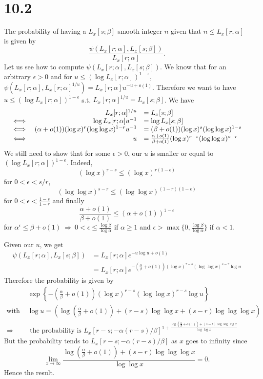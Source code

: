 \documentclass[12pt,a4paper]{article}
\newcommand {\thus}{\Rightarrow\:}
\newcommand {\Lfunc}[2]{L_x[#1;#2]}
\newcommand {\Ls}{\Lfunc{s}{\beta}}
\newcommand {\Lr}{\Lfunc{r}{\alpha}}
\newcommand {\Lrs}{\Lfunc{r-s}{-\alpha(r-s)/\beta}}
\begin{document}
\section{10.2}
The probability of having a $\Lfunc{s}{\beta}$-smooth integer $n$ given that $n \leq \Lfunc{r}{\alpha}$ is given by
\[
    \frac{\psi(\Lfunc{r}{\alpha},\Lfunc{s}{\beta})}{\Lfunc{r}{\alpha}}.
\]
Let us see how to compute $\psi(\Lr,\Ls)$.
We know that for an arbitrary $\epsilon>0$ and for $u \leq (\log\Lr)^{1-\epsilon}$, $\psi(\Lr,\Lr^{1/u}) = \Lr u^{-u+o(1)}$.
Therefore we want to have $u\leq (\log\Lr)^{1-\epsilon}$ s.t. $\Lr^{1/u} = \Ls$.
We have
\[
    \begin{array}{l r l}
        & \Lr^{1/u} &= \Ls       \\
   \iff & \log\Lr u^{-1} &= \log\Ls\\
   \iff & (\alpha + o(1))(\log x)^r(\log\log x)^{1-r} u^{-1} &= (\beta + o(1))(\log x)^s (\log\log x)^{1-s}\\
   \iff & u &= \frac{\alpha + o(1)}{\beta + o(1)} (\log x)^{r-s}(\log\log x)^{s-r}\\
    \end{array}
\]
We still need to show that for some $\epsilon > 0$, our $u$ is smaller or equal to $(\log\Lr)^{1-\epsilon}$.
Indeed, \[(\log x)^{r-s} \leq (\log x)^{r(1-\epsilon)}\] for $0 < \epsilon < s/r$, \[(\log\log x)^{s-r} \leq (\log\log x)^{(1-r)(1-\epsilon)}\] for $0 < \epsilon < \frac{1-s}{1-r}$
and finally \[\frac{\alpha + o(1)}{\beta + o(1)} \leq (\alpha + o(1))^{1-\epsilon}\] for $\alpha^{\epsilon} \leq \beta + o(1) \:\thus 0 < \epsilon \leq \frac{\log\beta}{\log\alpha}$ if 
$\alpha \geq 1$ and $\epsilon > \max\{0,\frac{\log\beta}{\log\alpha}\}$ if $\alpha < 1$.

Given our $u$, we get
\[
    \begin{split}
        \psi(\Lr,\Ls) &= \Lr e^{-u\log u + o(1)}\\
                      &= \Lr e^{-(\frac{\alpha}{\beta} + o(1))(\log x)^{r-s}(\log\log x)^{s-r}\log u}
    \end{split}
\]
Therefore the probability is given by
\[
    \begin{split}
        &\exp\left\{-\left(\frac{\alpha}{\beta} + o(1)\right)(\log x)^{r-s}(\log\log x)^{r-s}\log u\right\}\\
    \mbox{with } &\log u = \left(\log\left(\frac{\alpha}{\beta} + o(1)\right) + (r-s)\log\log x + (s-r)\log\log\log x \right)\\
           \thus &\mbox{ the probability is } \Lrs^{1 + \frac{\log(\frac{\alpha}{\beta} + o(1)) + (s-r)\log\log\log x}{\log\log x}}
    \end{split}
\]
But the probability tends to $\Lrs$ as $x$ goes to infinity since 
\[
    \lim_{x\rightarrow\infty}\frac{\log(\frac{\alpha}{\beta} + o(1)) + (s-r)\log\log\log x}{\log\log x} = 0.
\]
Hence the result.
\end{document}

